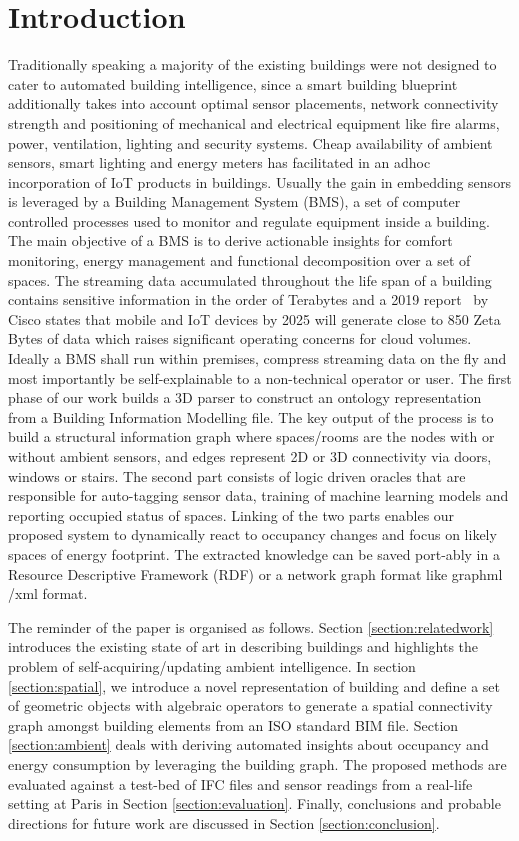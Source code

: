 \documentclass[conference]{IEEEtran}
\begin{document}
\section{Introduction}
\label{section:introduction}
Traditionally speaking a majority of the existing buildings were not designed to cater to automated building intelligence, since a smart building blueprint additionally takes into account optimal sensor placements, network connectivity strength and positioning of mechanical and electrical equipment like fire alarms, power, ventilation, lighting and security systems. Cheap availability of ambient sensors, smart lighting and energy meters has facilitated in an adhoc incorporation of IoT products in buildings. Usually the gain in embedding sensors is leveraged by a Building Management System (BMS), a set of computer controlled processes used to monitor and regulate equipment inside a building. The main objective of a BMS is to derive actionable insights for comfort monitoring, energy management and functional decomposition over a set of spaces. The streaming data accumulated throughout the life span of a building contains sensitive information in the order of Terabytes and a 2019 report~\cite{forecast2019cisco}  by Cisco states that mobile and IoT devices by 2025 will generate close to 850 Zeta Bytes of data which raises significant operating concerns for cloud volumes. Ideally a BMS shall run within premises, compress streaming  data on the fly and most importantly be self-explainable to a non-technical operator or user. The first phase of our work builds a 3D parser to construct an ontology representation from a Building Information Modelling file. The key output of the process is to build a structural information graph where spaces/rooms are the nodes with or without ambient sensors, and edges represent 2D or 3D connectivity via doors, windows or stairs. The second part consists of logic driven oracles that are responsible for auto-tagging sensor data, training of machine learning models and reporting occupied status of spaces. Linking of the two parts enables our proposed system to dynamically react to occupancy changes and focus on likely spaces of  energy footprint. The extracted knowledge can be saved port-ably in a Resource Descriptive Framework (RDF)  or a network graph format like graphml /xml format.


The reminder of the paper is organised as follows. Section \ref{section:relatedwork} introduces the existing state of art in describing buildings and highlights the problem of self-acquiring/updating ambient intelligence. In section \ref{section:spatial}, we introduce a novel representation of building and define a set of geometric objects with algebraic operators to generate a spatial connectivity graph amongst building elements from an ISO standard BIM file. Section \ref{section:ambient} deals with deriving automated insights about occupancy and energy consumption by leveraging the building graph. The proposed methods are evaluated against a test-bed of IFC files and sensor readings from a real-life setting at Paris in Section \ref{section:evaluation}. Finally, conclusions and probable directions for future work are discussed in Section \ref{section:conclusion}.
\end{document}
